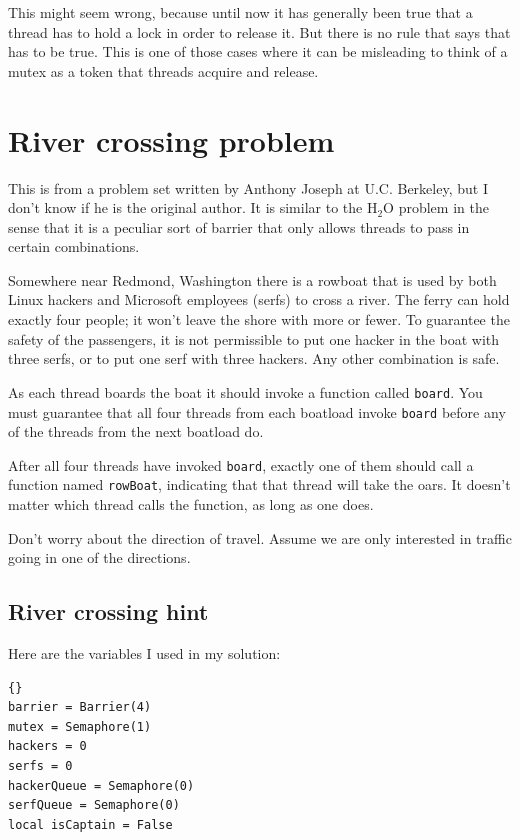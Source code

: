 \documentclass{book}
\begin{document}
This might seem wrong, because until now it
has generally been true that a thread has to hold a lock in
order to release it.  But there is no rule that says that has
to be true.  This is one of those cases where it can be misleading
to think of a mutex as a token that threads acquire and release.


\section {River crossing problem}

This is from a problem set written by Anthony Joseph
at U.C. Berkeley, but I don't know if he is the original author.
It is similar to the H$_2$O problem in the sense that it is
a peculiar sort of barrier that only allows threads to pass
in certain combinations.

Somewhere near Redmond, Washington there is a rowboat that is used by
both Linux hackers and Microsoft employees (serfs) to cross a river.  The
ferry can hold exactly four people; it won't leave the shore with more
or fewer.  To guarantee the safety of the passengers, it is not
permissible to put one hacker in the boat with three serfs, or to
put one serf with three hackers.  Any other combination is safe.

As each thread boards the boat it should invoke a function
called {\tt board}.  You must guarantee that all four threads
from each boatload invoke {\tt board} before any of the threads
from the next boatload do.

After all four threads have invoked {\tt board}, exactly one of
them should call a function named {\tt rowBoat}, indicating
that that thread will take the oars.  It doesn't matter which thread
calls the function, as long as one does.

Don't worry about the direction of travel.  Assume we are
only interested in traffic going in one of the directions.



\subsection {River crossing hint}

Here are the variables I used in my solution:

\begin{lstlisting}[title={River crossing hint}]{}
barrier = Barrier(4)
mutex = Semaphore(1)
hackers = 0
serfs = 0
hackerQueue = Semaphore(0)
serfQueue = Semaphore(0)
local isCaptain = False
\end{lstlisting}
\end{document}
